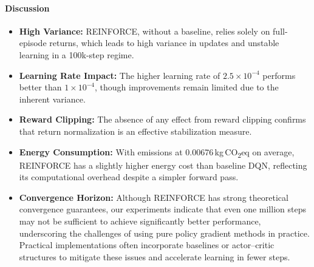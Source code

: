 \paragraph{Discussion}
\begin{itemize}
	\item \textbf{High Variance:} REINFORCE, without a baseline, relies solely on full-episode returns, which leads to high variance in updates and unstable learning in a 100k-step regime.
	\item \textbf{Learning Rate Impact:} The higher learning rate of $2.5\times10^{-4}$ performs better than $1\times10^{-4}$, though improvements remain limited due to the inherent variance.
	\item \textbf{Reward Clipping:} The absence of any effect from reward clipping confirms that return normalization is an effective stabilization measure.
	\item \textbf{Energy Consumption:} With emissions at \num{0.00676}\,kg\,CO\textsubscript{2}eq on average, REINFORCE has a slightly higher energy cost than baseline DQN, reflecting its computational overhead despite a simpler forward pass.
	\item \textbf{Convergence Horizon:} Although REINFORCE has strong theoretical convergence guarantees, our experiments indicate that even one million steps may not be sufficient to achieve significantly better performance, underscoring the challenges of using pure policy gradient methods in practice. Practical implementations often incorporate baselines or actor–critic structures to mitigate these issues and accelerate learning in fewer steps.
\end{itemize}

